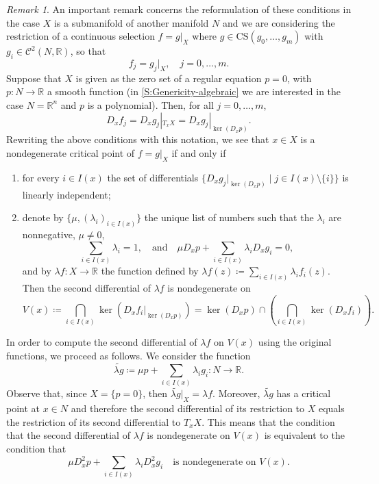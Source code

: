 \documentclass{amsart}
\newcommand{\R}{\mathbb{R}}
\theoremstyle{definition}
\theoremstyle{remark}
\newtheorem{remark}[subsubsection]{Remark}
\begin{document}
\begin{remark}
\label{remark:restriction}
An important remark concerns the reformulation of these conditions in the case $X$ is a submanifold of another manifold $N$ and we are considering the restriction of a continuous selection $f=g|_X$ where $g\in \mathrm{CS}(g_0, \ldots, g_m)$ with $g_i\in \mathcal{C}^2(N, \R)$, so that
$$f_j=g_j|_{X}, \quad j=0, \ldots, m.$$  Suppose that $X$ is given as the zero set of a regular equation $p=0$, with $p:N\to \R$ a smooth function (in \cref{S:Genericity-algebraic} we are interested in the case $N=\R^n$ and $p$ is a polynomial). Then, for all $j=0, \ldots, m$,
$$D_xf_j=D_xg_j|_{T_xX}=D_xg_j|_{\ker(D_xp)}.$$
Rewriting the above conditions with this notation, we see that $x\in X$ is a nondegenerate critical point of $f=g|_X$ if and only if
\begin{enumerate}
\item for every $i\in I(x)$ the set of differentials $\{D_x g_j|_{\ker(D_xp)} \mid j\in I(x)\setminus \{i\}\}$ is linearly independent;
\item denote by $\{\mu, (\lambda_i)_{i\in I(x)}\}$ the unique list of  numbers such that the $\lambda_i$ are nonnegative, $\mu\neq 0$,
\[
\sum_{i \in I(x)} \lambda_i = 1,
\quad \textrm{and} \quad
\mu D_xp+\sum_{i \in I(x)} \lambda_i D_x g_i = 0,
\]
and by $\lambda f \colon X\to \R$ the function defined by $\lambda f(z)\coloneqq\sum_{i\in I(x)}\lambda_if_i(z).$ Then the second differential of $\lambda f$ is nondegenerate on 
\[
V(x) \coloneqq \bigcap_{i\in I(x)}\ker(D_xf_i|_{\ker(D_xp)})=\ker(D_xp)\cap\left( \bigcap_{i\in I(x)}\ker(D_xf_i)\right).
\]
\end{enumerate}
In order to compute the second differential of $\lambda f$ on $V(x)$ using the original functions, we proceed as follows. We consider the function
\[
\widetilde{\lambda g} \coloneqq \mu p+\sum_{i\in I(x)}\lambda_ig_i \colon N \to \R.
\]
Observe that, since $X=\{p=0\}$, then $\widetilde{\lambda g}|_{X}=\lambda f.$ Moreover, $\widetilde{\lambda g}$ has a critical point at $x\in N$ and therefore the second differential of its restriction to $X$ equals the restriction of its second differential to $T_xX$. This means that the condition that the second differential of $\lambda f$ is nondegenerate on $V(x)$ is equivalent to the condition that
$$\mu D_x^2p+\sum_{i\in I(x)}\lambda_iD_x^2g_i\quad \textrm{is nondegenerate on $V(x)$}.$$
\end{remark}
\end{document}
